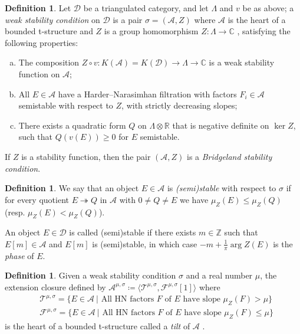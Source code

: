 \documentclass[11pt]{amsart}
\theoremstyle{definition}
\newtheorem{definition}[thm]{Definition}
\newcommand{\C}{\mathbb{C}}
\newcommand{\Z}{\mathbb{Z}}
\newcommand{\R}{\mathbb{R}}
\newcommand{\sA}{\mathcal{A}}
\newcommand{\sD}{\mathcal{D}}
\newcommand{\AAA}[1]{\textcolor{red}{#1}}
\begin{document}
\begin{definition} Let $\sD$ be a triangulated category, and let $\Lambda$ and $v$ be as above; a \emph{weak stability condition} on $\sD$ is a pair $\sigma=(\sA, Z)$ where $\sA$ is the heart of a bounded t-structure and $Z$ is a group homomorphism $Z \colon \Lambda \to \C$ , satisfying the following properties:
\begin{enumerate}[(a)]
    \item The composition $Z \circ v \colon K(\sA)=K(\sD) \to \Lambda \to \C$ is a weak stability function on $\sA$;
    \item All $E\in \sA$ have a Harder--Narasimhan filtration with factors $F_i\in \sA$ semistable with respect to $Z$, with strictly decreasing slopes; 
    \item There exists a quadratic form $Q$ on $\Lambda\otimes \R$ that is negative definite on $\ker Z$, such that $Q(v(E))\geq 0$ for $E$ semistable.
\end{enumerate}
If $Z$ is a stability function, then the pair $(\sA,Z)$ is a \emph{Bridgeland stability condition}.
\end{definition}
\begin{definition}

We say that an object $E\in\sA$ is \emph{(semi)stable} with respect to $\sigma$ if for every quotient $E\twoheadrightarrow Q$ in $\sA$ with $0\neq Q\neq E$ we have $\mu_Z(E)\leq\mu_Z(Q)$ (resp. $\mu_Z(E)<\mu_Z(Q)$).

An object $E\in\sD$ is called (semi)stable if there exists $m\in \Z$ such that $E[m]\in\mathcal{A}$ and $E[m]$ is (semi)stable, in which case $-m+\frac{1}{\pi}\arg Z(E)$ is the \emph{phase} of $E$. 
\end{definition}


\begin{definition}\label{tiltofheart}
Given a weak stability condition $\sigma$ and a real number $\mu$, the extension closure defined by $\sA^{\mu, \sigma} \coloneqq \langle \mathcal{T}^{\mu,\sigma}, \mathcal{F}^{\mu,\sigma}[1] \rangle$ where 
\begin{align*}
&\mathcal{T}^{\mu,\sigma}=\{E \in \sA \ | \text{ All HN factors $F$ of $E$ have slope $\mu_Z(F)>\mu$} \} \\
&\mathcal{F}^{\mu,\sigma}=\{E \in \sA \ | \text{ All HN factors $F$ of $E$ have slope $\mu_Z(F)\leq\mu$} \}
\end{align*}
is the heart of a bounded t-structure called a \emph{tilt} of $\sA$ \cite{HRS96,BLMS17}.
\end{definition}
\end{document}
